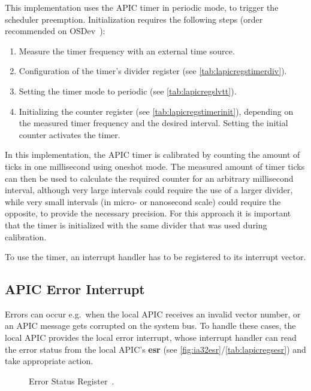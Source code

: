 This implementation uses the APIC timer in periodic mode, to trigger the scheduler preemption.
Initialization requires the following steps (order recommended on OSDev~\autocite{osdev}):

\begin{enumerate}
  \item Measure the timer frequency with an external time source.
  \item Configuration of the timer's divider register (see \autoref{tab:lapicregstimerdiv}).
  \item Setting the timer mode to periodic (see \autoref{tab:lapicregslvtt}).
  \item Initializing the counter register (see \autoref{tab:lapicregstimerinit}), depending on the measured timer frequency and the desired interval.
        Setting the initial counter activates the timer.
\end{enumerate}

In this implementation, the APIC timer is calibrated by counting the amount of ticks in one millisecond using oneshot mode.
The measured amount of timer ticks can then be used to calculate the required counter for an arbitrary millisecond interval, although very large intervals could require the use of a larger divider, while very small intervals (in micro- or nanosecond scale) could require the opposite, to provide the necessary precision.
For this approach it is important that the timer is initialized with the same divider that was used during calibration.

To use the timer, an interrupt handler has to be registered to its interrupt vector.

\subsection{APIC Error Interrupt}
\label{subsec:lapicerror}

Errors can occur e.g.\ when the local APIC receives an invalid vector number, or an APIC message gets corrupted on the system bus.
To handle these cases, the local APIC provides the local error interrupt, whose interrupt handler can read the error status from the local APIC's \textbf{\gls{esr}} (see \autoref{fig:ia32esr}/\autoref{tab:lapicregsesr}) and take appropriate action.

\begin{figure}[h]
  \centering
  \begin{subfigure}[b]{0.7\textwidth}
    
  \end{subfigure}
  \caption{Error Status Register~\autocite[sec.~3.11.5.3]{ia32}.}
  \label{fig:ia32esr}
\end{figure}

